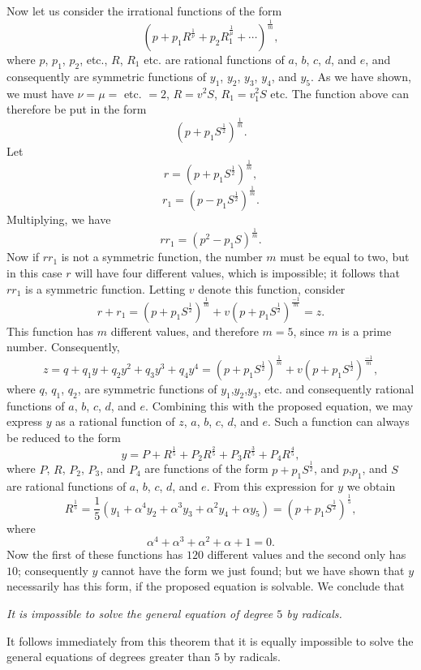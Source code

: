 \documentclass[12pt]{article}
\begin{document}
Now let us consider the irrational functions of the form 
\[ \left( p + p_1 R^{\frac{1}{\nu}} + p_2 R_1^{\frac{1}{\mu}} + \cdots \right)^{\frac{1}{m}}, \]
where $p$, $p_1$, $p_2$, etc., $R$, $R_1$ etc. are rational functions of $a$, $b$, $c$, $d$, and $e$, and consequently are symmetric functions of $y_1$, $y_2$, $y_3$, $y_4$, and $y_5$.  As we have shown, we must have $\nu = \mu =$ etc. $=2$, $R= v^2S$, $R_1 = v_1^2 S$ etc.  The function above can therefore be put in the form 
\[ (p+p_1 S^{\frac{1}{2}})^{\frac{1}{m}}. \]
Let 
\[ r = (p+p_1S^{\frac{1}{2}})^{\frac{1}{m}}, \]
\[ r_1 = (p - p_1S^{\frac{1}{2}})^{\frac{1}{m}} .\] 
Multiplying, we have
\[ rr_1 = (p^2 - p_1S)^{\frac{1}{m}}. \]
Now if $rr_1$ is not a symmetric function, the number $m$ must be equal to two, but in this case $r$ will have four different values, which is impossible; it follows that $rr_1$ is a symmetric function.  Letting $v$ denote this function, consider 
\[ r + r_1 = (p+p_1S^{\frac{1}{2}})^{\frac{1}{m}} + v(p+p_1S^{\frac{1}{2}})^{\frac{-1}{m}} = z. \]
This function has $m$ different values,  and therefore $m=5$, since $m$ is a prime number.  Consequently, 
\[ z = q + q_1y + q_2 y^2 + q_3 y^3 + q_4 y^4 = (p+p_1S^{\frac{1}{2}})^{\frac{1}{m}} + v(p+p_1S^{\frac{1}{2}})^{\frac{-1}{m}}, \]
where $q$, $q_1$, $q_2$, are symmetric functions of $y_1$,$y_2$,$y_3$, etc. and consequently rational functions of $a$, $b$, $c$, $d$, and $e$.  Combining this with the proposed equation, we may express $y$ as a rational function of $z$, $a$, $b$, $c$, $d$, and $e$.  Such a function can always be reduced to the form 
\[ y = P + R^{\frac{1}{5}} + P_2 R^{\frac{2}{5}} + P_3 R^{\frac{3}{5}} + P_4 R^{\frac{4}{5}}, \]
where $P$, $R$, $P_2$, $P_3$, and $P_4$ are functions of the form $p + p_1S^{\frac{1}{2}}$, and $p$,$p_1$, and $S$ are rational functions of $a$, $b$, $c$, $d$, and $e$.  From this expression for $y$ we obtain
\[ R^{\frac{1}{5}} = \frac{1}{5}(y_1 + \alpha^4 y_2 + \alpha^3 y_3 + \alpha^2 y_4 + \alpha y_5) = (p + p_1 S^{\frac{1}{2}})^{\frac{1}{5}}, \]
where 
\[ \alpha^4 + \alpha^3 + \alpha^2 + \alpha + 1 = 0. \]
Now the first of these functions has $120$ different values and the second only has $10$; consequently $y$ cannot have the form we just found; but we have shown that $y$ necessarily has this form, if the proposed equation is solvable.  We conclude that 
\begin{center} \emph{It is impossible to solve the general equation of degree $5$ by radicals.} \end{center}
It follows immediately from this theorem that it is equally impossible to solve the general equations of degrees greater than $5$ by radicals.
  
\end{document}
